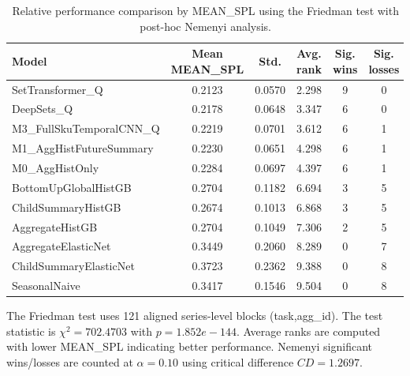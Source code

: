 \begin{table}[H]
\centering
\caption{Relative performance comparison by MEAN_SPL using the Friedman test with post-hoc Nemenyi analysis.}
\label{tab:stats_mean_spl}
\begin{threeparttable}
\begin{tabular}{lccccc}
\toprule
Model & Mean MEAN_SPL & Std. & Avg. rank & Sig. wins & Sig. losses \\
\midrule
SetTransformer\_Q & 0.2123 & 0.0570 & 2.298 & 9 & 0 \\
DeepSets\_Q & 0.2178 & 0.0648 & 3.347 & 6 & 0 \\
M3\_FullSkuTemporalCNN\_Q & 0.2219 & 0.0701 & 3.612 & 6 & 1 \\
M1\_AggHistFutureSummary & 0.2230 & 0.0651 & 4.298 & 6 & 1 \\
M0\_AggHistOnly & 0.2284 & 0.0697 & 4.397 & 6 & 1 \\
BottomUpGlobalHistGB & 0.2704 & 0.1182 & 6.694 & 3 & 5 \\
ChildSummaryHistGB & 0.2674 & 0.1013 & 6.868 & 3 & 5 \\
AggregateHistGB & 0.2704 & 0.1049 & 7.306 & 2 & 5 \\
AggregateElasticNet & 0.3449 & 0.2060 & 8.289 & 0 & 7 \\
ChildSummaryElasticNet & 0.3723 & 0.2362 & 9.388 & 0 & 8 \\
SeasonalNaive & 0.3417 & 0.1546 & 9.504 & 0 & 8 \\
\bottomrule
\end{tabular}
\begin{tablenotes}
\footnotesize \item The Friedman test uses 121 aligned series-level blocks (task,agg\_id). The test statistic is $\chi^2=702.4703$ with $p=1.852e-144$. Average ranks are computed with lower MEAN_SPL indicating better performance. Nemenyi significant wins/losses are counted at $\alpha=0.10$ using critical difference $CD=1.2697$.
\end{tablenotes}
\end{threeparttable}
\end{table}
